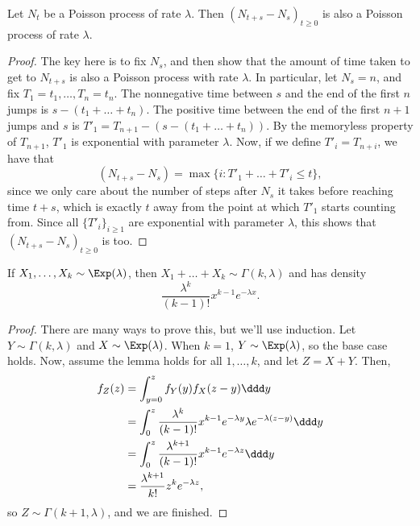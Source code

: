 \begin{theorem}
\thmlabel

Let $N_t$ be a Poisson process of rate $\lambda$. Then $(N_{t+s}-N_s)_{t\geq 0}$ is also a Poisson process of rate $\lambda$. 
\end{theorem}

\begin{proof}
	The key here is to fix $N_s$, and then show that the amount of time taken to get to $N_{t+s}$ is also a Poisson process with rate $\lambda$. In particular, let $N_s = n$, and fix $T_1 = t_1, \hdots, T_n = t_n$. The nonnegative time between $s$ and the end of the first $n$ jumps is $s - (t_1 + \hdots + t_n)$. The positive time between the end of the first $n+1$ jumps and $s$ is $T'_1 = T_{n+1} - (s - (t_1 + \hdots + t_n))$. By the memoryless property of $T_{n+1}$, $T'_1$ is exponential with parameter $\lambda$. Now, if we define $T'_i = T_{n+i}$, we have that 
	\[(N_{t+s}-N_s) = \max\{i : T'_1 + \hdots + T'_i \leq t\},\]
	since we only care about the number of steps after $N_s$ it takes before reaching time $t+s$, which is exactly $t$ away from the point at which $T'_1$ starts counting from. Since all $\{T'_i\}_{i\geq 1}$ are exponential with parameter $\lambda$, this shows that $(N_{t+s}-N_s)_{t\geq 0}$ is too.  
\end{proof}

\begin{theorem}
\lemlabel

If $X_1, \hdots, X_k\sim \Exp(\lambda)$, then $X_1+\hdots+X_k\sim \Gamma(k,\lambda)$ and has density 
\[\frac{\lambda^k}{(k-1)!}x^{k-1}e^{-\lambda x}. \] 
\end{theorem}

\begin{proof}
There are many ways to prove this, but we'll use induction. Let $Y\sim \Gamma(k, \lambda)$ and $X\sim \Exp(\lambda)$. When $k=1$, $Y\sim \Exp(\lambda)$, so the base case holds. Now, assume the lemma holds for all $1,\hdots,k$, and let $Z = X + Y$. Then, 
\begin{align*}
	f_Z(z) &= \int_{y=0}^z f_Y(y)f_X(z-y)\ddd y \\
				 &= \int_0^z \frac{\lambda^k}{(k-1)!}x^{k-1}e^{-\lambda y}\lambda e^{-\lambda(z-y)}\ddd y\\
				 &= \int_0^z \frac{\lambda^{k+1}}{(k-1)!}x^{k-1}e^{-\lambda z}\ddd y\\
				 &= \frac{\lambda^{k+1}}{k!}z^ke^{-\lambda z},
\end{align*}
so $Z\sim \Gamma(k+1,\lambda)$, and we are finished. 
\end{proof}

